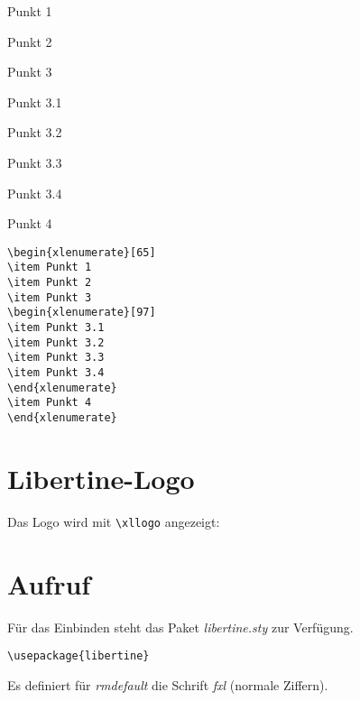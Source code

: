 \documentclass{fontdokuold}
\begin{document}
\begin{xlenumerate}[65]
\item Punkt 1
\item Punkt 2
\item Punkt 3
\begin{xlenumerate}[97]
\item Punkt 3.1
\item Punkt 3.2
\item Punkt 3.3
\item Punkt 3.4
\end{xlenumerate}
\item Punkt 4
\end{xlenumerate}

\begin{lstlisting}
\begin{xlenumerate}[65]
\item Punkt 1
\item Punkt 2
\item Punkt 3
\begin{xlenumerate}[97]
\item Punkt 3.1
\item Punkt 3.2
\item Punkt 3.3
\item Punkt 3.4
\end{xlenumerate}
\item Punkt 4
\end{xlenumerate}
\end{lstlisting}



\section{Libertine-Logo}

Das Logo wird mit \verb|\xllogo| angezeigt: {\Huge\xllogo}


\section{Aufruf}

Für das Einbinden steht das Paket \textit{libertine.sty} zur Verfügung.

\begin{lstlisting}
\usepackage{libertine}
\end{lstlisting}

Es definiert für \textit{rmdefault} die Schrift \textit{fxl} (normale Ziffern).

\end{document}
